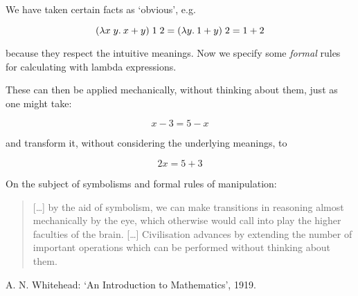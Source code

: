 \begin{slide*}


\vspace*{0.1cm}

We have taken certain facts as `obvious', e.g.

{\red $$ (\lambda x\; y.\: x + y)\;1\;2 = (\lambda y.\: 1 + y)\;2 = 1 + 2 $$}

because they respect the intuitive meanings. Now we specify some {\em formal}
rules for calculating with lambda expressions.

These can then be applied mechanically, without thinking about them, just as
one might take:

{\red $$ x - 3 = 5 - x$$}

and transform it, without considering the underlying meanings, to

{\red $$ 2 x = 5 + 3 $$}
\end{slide*}



\begin{slide*}


\vspace*{0.5cm}

On the subject of symbolisms and formal rules of manipulation:

\begin{green}\begin{quote}
[\ldots] by the aid of symbolism, we can make transitions in reasoning almost
mechanically by the eye, which otherwise would call into play the higher
faculties of the brain. [\ldots] Civilisation advances by extending the number
of important operations which can be performed without thinking about them.
\end{quote}\end{green}

A. N. Whitehead: `An Introduction to Mathematics', 1919.

\end{slide*}



